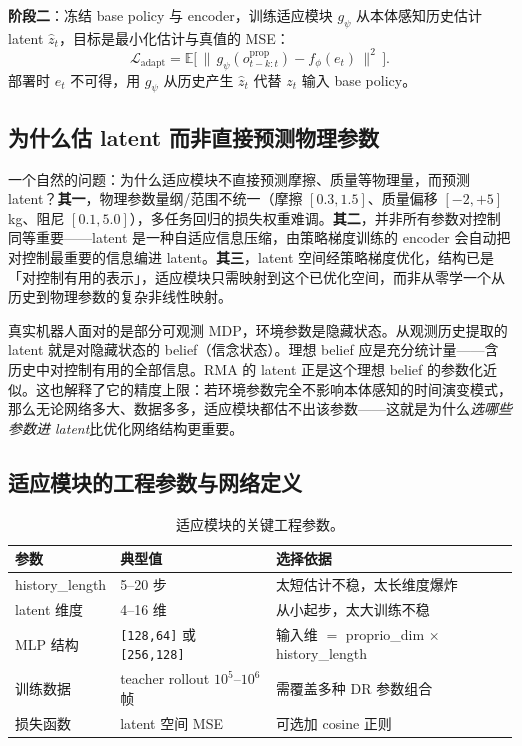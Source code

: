 \textbf{阶段二}：冻结 base policy 与 encoder，训练适应模块 $g_\psi$ 从本体感知历史估计 latent $\hat z_t$，目标是最小化估计与真值的 MSE：
\begin{equation}
\mathcal{L}_{\text{adapt}} = \mathbb{E}\Big[\,\big\lVert\, g_\psi(o_{t-k:t}^{\text{prop}}) - f_\phi(e_t)\,\big\rVert^2\,\Big].
\label{eq:rlmc-priv-rma-loss}
\end{equation}
部署时 $e_t$ 不可得，用 $g_\psi$ 从历史产生 $\hat z_t$ 代替 $z_t$ 输入 base policy。

\subsection{为什么估 latent 而非直接预测物理参数}
\label{sec:rlmc-priv-whylatent}

一个自然的问题：为什么适应模块不直接预测摩擦、质量等物理量，而预测 latent？\textbf{其一}，物理参数量纲/范围不统一（摩擦 $[0.3,1.5]$、质量偏移 $[-2,+5]$\,kg、阻尼 $[0.1,5.0]$），多任务回归的损失权重难调。\textbf{其二}，并非所有参数对控制同等重要——latent 是一种自适应信息压缩，由策略梯度训练的 encoder 会自动把对控制最重要的信息编进 latent。\textbf{其三}，latent 空间经策略梯度优化，结构已是「对控制有用的表示」，适应模块只需映射到这个已优化空间，而非从零学一个从历史到物理参数的复杂非线性映射。

\begin{insight}[适应模块 = POMDP 的 belief state 参数化近似]\label{ins:rlmc-priv-belief}
真实机器人面对的是部分可观测 MDP，环境参数是隐藏状态。从观测历史提取的 latent 就是对隐藏状态的 belief（信念状态）。理想 belief 应是充分统计量——含历史中对控制有用的全部信息。RMA 的 latent 正是这个理想 belief 的参数化近似。这也解释了它的精度上限：若环境参数完全不影响本体感知的时间演变模式，那么无论网络多大、数据多多，适应模块都估不出该参数——这就是为什么\emph{选哪些参数进 latent}比优化网络结构更重要。
\end{insight}

\subsection{适应模块的工程参数与网络定义}
\label{sec:rlmc-priv-estparam}

\begin{table}[H]
\centering
\small
\caption{适应模块的关键工程参数。}
\label{tab:rlmc-priv-estparam}
\begin{tabular}{@{}lll@{}}
\toprule
参数 & 典型值 & 选择依据 \\
\midrule
history\_length & 5--20 步 & 太短估计不稳，太长维度爆炸 \\
latent 维度 & 4--16 维 & 从小起步，太大训练不稳 \\
MLP 结构 & \texttt{[128,64]} 或 \texttt{[256,128]} & 输入维 $=$ proprio\_dim $\times$ history\_length \\
训练数据 & teacher rollout $10^5$--$10^6$ 帧 & 需覆盖多种 DR 参数组合 \\
损失函数 & latent 空间 MSE & 可选加 cosine 正则 \\
\bottomrule
\end{tabular}
\end{table}

